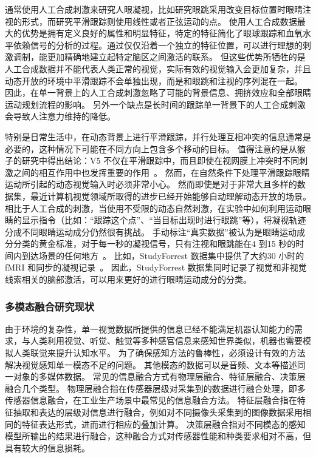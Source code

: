 \documentclass[a4paper,zihao=-4]{article}
\begin{document}
通常使用人工合成刺激来研究人眼凝视，比如研究眼跳采用改变目标位置时眼睛注视的形式，而研究平滑跟踪则使用线性或者正弦运动的点。
使用人工合成数据最大的优势是拥有定义良好的属性和明显特征，特定的特征简化了眼球跟踪和血氧水平依赖信号的分析的过程。通过仅仅沿着一个独立的特征位置，可以进行理想的刺激调制，能更加精确地建立起特定脑区之间激活的联系。
但这些优势所牺牲的是人工合成数据并不能代表人类正常的视觉，实际有效的视觉输入会更加复杂，并且动态开放的环境中平滑跟踪不会单独出现，而是和眼跳和注视的序列混在一起。
因此，在单一背景上的人工合成刺激忽略了可能的背景信息、拥挤效应和全部眼睛运动规划流程的影响。
另外一个缺点是长时间的跟踪单一背景下的人工合成刺激会导致人注意力维持的降低。

特别是日常生活中，在动态背景上进行平滑跟踪，并行处理互相冲突的信息通常是必要的，这种情况下可能在不同方向上包含多个移动的目标。
值得注意的是从猴子的研究中得出结论：V5 不仅在平滑跟踪中，而且即使在视网膜上冲突时不同刺激之间的相互作用中也发挥重要的作用~\cite{neural_sp}。
然而，在自然条件下处理平滑跟踪眼睛运动所引起的动态视觉输入时必须非常小心。
然而即使是对于非常大且多样的数据集，最近计算机视觉领域所取得的进步已经开始能够自动理解动态开放的场景。
相比于人工合成的刺激，当使用不受限的动态自然刺激，在实验中如何利用运动眼睛的显示指令（比如：“跟踪这个点”、“当目标出现时进行眼跳”等），将凝视轨迹分成不同眼睛运动成分仍然很有挑战。
手动标注“真实数据”被认为是眼睛运动成分分类的黄金标准，对于每一秒的凝视信号，只有注视和眼跳能在4 到15 秒的时间内到达场景的任何地方~\cite{gold_standard}。
比如，StudyForrest 数据集中提供了大约30 小时的fMRI 和同步的凝视记录~\cite{gaze_forrest}。
因此，StudyForrest 数据集同时记录了视觉和非视觉线索相关的脑部激活，可以用来更好的进行眼睛运动成分的分类。


\subsubsection{多模态融合研究现状}

由于环境的复杂性，单一视觉数据所提供的信息已经不能满足机器认知能力的需求，与人类利用视觉、听觉、触觉等多种感官信息来感知世界类似，机器也需要模拟人类联觉来提升认知水平。
为了确保感知方法的鲁棒性，必须设计有效的方法解决视觉感知单一模态不足的问题。
其他模态的数据可以是音频、文本等描述同一对象的多媒体数据。
常见的信息融合方式有物理层融合、特征层融合、决策层融合几个类型。
物理层融合指在传感器层级对采集到的数据进行融合处理，即多传感器信息融合，在工业生产场景中最常见的信息融合方法。
特征层融合指在特征抽取和表达的层级对信息进行融合，例如对不同摄像头采集到的图像数据采用相同的特征表达形式，进而进行相应的叠加计算。
决策层融合指对不同模态的感知模型所输出的结果进行融合，这种融合方式对传感器性能和种类要求相对不高，但具有较大的信息损耗。
\end{document}
